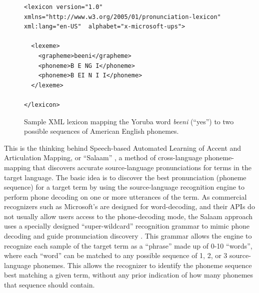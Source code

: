 \documentclass[11pt]{article}
\begin{document}

\begin{figure}
\begin{lstlisting}	
<lexicon version="1.0" xmlns="http://www.w3.org/2005/01/pronunciation-lexicon" xml:lang="en-US"  alphabet="x-microsoft-ups">
		 
  <lexeme>
    <grapheme>beeni</grapheme>
    <phoneme>B E NG I</phoneme>
    <phoneme>B EI N I I</phoneme>
  </lexeme>
  
</lexicon>
\end{lstlisting}
\caption{Sample XML lexicon mapping the Yoruba word \textit{beeni} (``yes'') to two possible sequences of American English phonemes.\label{fig:lexicon}}
\end{figure}



This is the thinking behind Speech-based Automated Learning of Accent and Articulation Mapping, or ``Salaam'' \cite{Sherwani09,Qiao10,Chan12}, a
method of cross-language phoneme-mapping 
that
discovers accurate source-language pronunciations for terms in the 
target language. 
The basic idea 
is to discover the best pronunciation (phoneme sequence) for a target term by using the source-language recognition engine to perform phone decoding on one or more utterances of the term. As commercial recognizers such as Microsoft's are designed for word-decoding, and their APIs do not usually allow users access to the phone-decoding mode, the Salaam approach uses a specially designed  ``super-wildcard'' recognition grammar 
to mimic phone decoding 
and guide pronunciation discovery \cite{Qiao10,Chan12}.
This grammar allows the engine to recognize each sample of the target term as a ``phrase'' made up of 0-10 ``words'',
where each ``word'' can be matched to any possible sequence of 1, 2, or 3 source-language phonemes.
This allows the recognizer to identify the phoneme sequence best matching a given term, without any prior indication of how many phonemes that sequence should contain.
\end{document}
